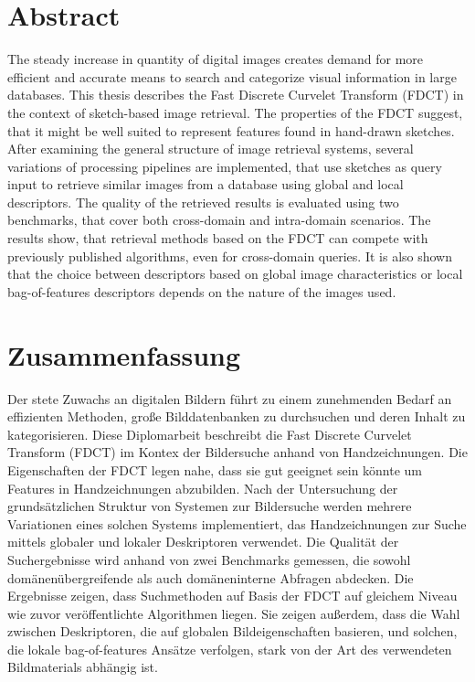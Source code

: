 \begingroup
\let\clearpage\relax
\let\cleardoublepage\relax
\let\cleardoublepage\relax

\chapter*{Abstract}
The steady increase in quantity of digital images creates demand for more
efficient and accurate means to search and categorize visual information in
large databases. This thesis describes the Fast Discrete Curvelet Transform
(FDCT) in the context of sketch-based image retrieval. The properties of the
FDCT suggest, that it might be well suited to represent features found in
hand-drawn sketches. After examining the general structure of image retrieval
systems, several variations of processing pipelines are implemented, that use
sketches as query input to retrieve similar images from a database using global
and local descriptors. The quality of the retrieved results is evaluated using
two benchmarks, that cover both cross-domain and intra-domain scenarios.
The results show, that retrieval methods based on the FDCT can compete with
previously published algorithms, even for cross-domain queries. It is also
shown that the choice between descriptors based on global image characteristics
or local bag-of-features descriptors depends on the nature of the images used.

\vfill

\chapter*{Zusammenfassung}
Der stete Zuwachs an digitalen Bildern führt zu einem zunehmenden Bedarf an
effizienten Methoden, große Bilddatenbanken zu durchsuchen und deren Inhalt zu
kategorisieren. Diese Diplomarbeit beschreibt die Fast Discrete Curvelet
Transform (FDCT) im Kontex der Bildersuche anhand von Handzeichnungen.
Die Eigenschaften der FDCT legen nahe, dass sie gut geeignet sein könnte um
Features in Handzeichnungen abzubilden. Nach der Untersuchung der
grundsätzlichen Struktur von Systemen zur Bildersuche werden mehrere
Variationen eines solchen Systems implementiert, das Handzeichnungen zur Suche
mittels globaler und lokaler Deskriptoren verwendet. Die Qualität der
Suchergebnisse wird anhand von zwei Benchmarks gemessen, die sowohl
domänenübergreifende als auch domäneninterne Abfragen abdecken.
Die Ergebnisse zeigen, dass Suchmethoden auf Basis der FDCT auf gleichem Niveau
wie zuvor veröffentlichte Algorithmen liegen. Sie zeigen außerdem, dass die
Wahl zwischen Deskriptoren, die auf globalen Bildeigenschaften basieren, und
solchen, die lokale bag-of-features Ansätze verfolgen, stark von der Art des
verwendeten Bildmaterials abhängig ist.

\endgroup			

\vfill
